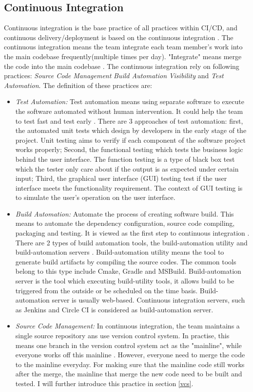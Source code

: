 \subsection{Continuous Integration}
Continuous integration is the base practice of all practices within CI/CD, and continuous delivery/deployment is based on the continuous integration \cite{pittet2018continuous}.
The continuous integration means the team integrate each team member's work into the main codebase frequently(multiple times per day). "Integrate" means merge the code into the main codebase \cite{fowler2006continuous}. The continuous integration rely on following practices: \textit{Source Code Management} \textit{Build Automation} \textit{Visibility} and \textit{Test Automation}. The definition of these practices are:
\begin{itemize}
    \label{TestA}
    \item \textit{Test Automation:} Test automation means using separate software to execute the software automated without human intervention. It could help the team to test fast and test early \cite{Testauto48:online}. There are 3 approaches of test automation: first, the automated unit tests which design by developers in the early stage of the project. Unit testing aims to verify if each component of the software project works properly; Second, the functional testing which tests the business logic behind the user interface. The function testing is a type of black box test which the tester only care about if the output is as expected under certain input; Third, the graphical user interface (GUI) testing test if the user interface meets the functionality requirement. The context of GUI testing is to simulate the user's operation on the user interface.
    \item \textit{Build Automation:} Automate the process of creating software build. This means to automate the dependency configuration, source code compiling, packaging and testing. It is viewed as the first step to continuous integration \cite{Buildaut62:online}. There are 2 types of build automation tools, the build-automation utility and build-automation servers \cite{ceruzzi2003history}. Build-automation utility means the tool to generate build artifacts by compiling the source codes. The common tools belong to this type include Cmake, Gradle and MSBuild. Build-automation server is the tool which executing build-utility tools, it allows build to be triggered from the outside or be scheduled on the time basis. Build-automation server is usually web-based. Continuous integration servers, such as Jenkins and Circle CI is considered as build-automation server. 
    \item \textit{Source Code Management:} In continuous integration, the team maintains a single source repository ans use version control system. In practise, this means one branch in the version control system act as the "mainline", while everyone works off this mainline \cite{fowler2006continuous}. However, everyone need to merge the code to the mainline everyday. For making sure that the mainline code still works after the merge, the mainline that merge the new code need to be built and tested. I will further introduce this practice in section \ref{vcs}. 
\end{itemize}
